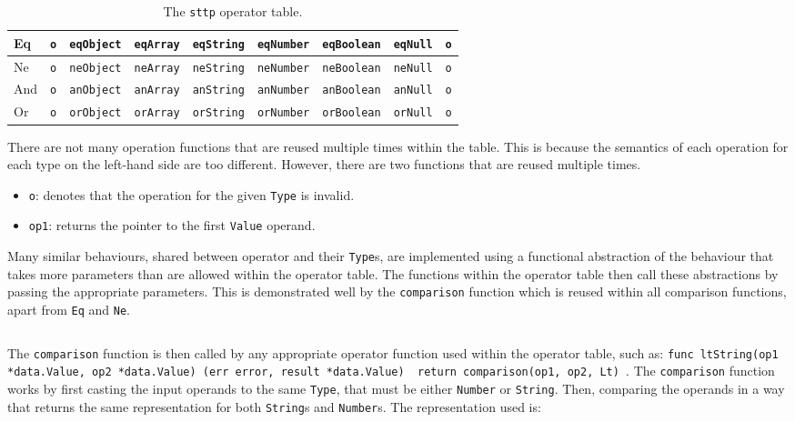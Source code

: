 \begin{table}[H]
\begin{tabular}{|l|l|l|l|l|l|l|l|l|}
    Eq                                              & \verb|o| & \verb|eqObject| & \verb|eqArray| & \verb|eqString| & \verb|eqNumber| & \verb|eqBoolean| & \verb|eqNull| & \verb|o| \\ \hline
    Ne                                              & \verb|o| & \verb|neObject| & \verb|neArray| & \verb|neString| & \verb|neNumber| & \verb|neBoolean| & \verb|neNull| & \verb|o| \\ \hline
    And                                             & \verb|o| & \verb|anObject| & \verb|anArray| & \verb|anString| & \verb|anNumber| & \verb|anBoolean| & \verb|anNull| & \verb|o| \\ \hline
    Or                                              & \verb|o| & \verb|orObject| & \verb|orArray| & \verb|orString| & \verb|orNumber| & \verb|orBoolean| & \verb|orNull| & \verb|o| \\ \hline
    \end{tabular}
    \cprotect\caption{The \verb|sttp| operator table.}
\end{table}

There are not many operation functions that are reused multiple times within the table. This is because the semantics of each operation for each type on the left-hand side are too different. However, there are two functions that are reused multiple times.

\begin{itemize}
    \item \verb|o|: denotes that the operation for the given \verb|Type| is invalid.
    \item \verb|op1|: returns the pointer to the first \verb|Value| operand.
\end{itemize}

Many similar behaviours, shared between operator and their \verb|Type|s, are implemented using a functional abstraction of the behaviour that takes more parameters than are allowed within the operator table. The functions within the operator table then call these abstractions by passing the appropriate parameters. This is demonstrated well by the \verb|comparison| function which is reused within all comparison functions, apart from \verb|Eq| and \verb|Ne|.

\inputminted[firstline=537, lastline=600, autogobble, breaklines, breakafter=., tabsize=4]{go}{../../src/eval/op_funcs.go}

The \verb|comparison| function is then called by any appropriate operator function used within the operator table, such as: \texttt{func ltString(op1 *data.Value, op2 *data.Value) (err error, result *data.Value) { return comparison(op1, op2, Lt) }}. The \verb|comparison| function works by first casting the input operands to the same \verb|Type|, that must be either \verb|Number| or \verb|String|. Then, comparing the operands in a way that returns the same representation for both \verb|String|s and \verb|Number|s. The representation used is:

